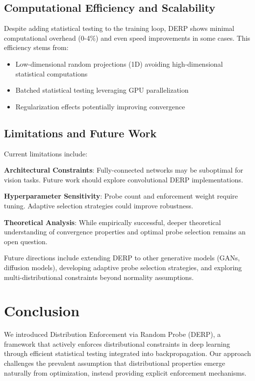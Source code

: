 \documentclass[11pt]{article}
\begin{document}
\subsection{Computational Efficiency and Scalability}

Despite adding statistical testing to the training loop, DERP shows minimal computational overhead (0-4\%) and even speed improvements in some cases. This efficiency stems from:

\begin{itemize}
\item Low-dimensional random projections (1D) avoiding high-dimensional statistical computations
\item Batched statistical testing leveraging GPU parallelization  
\item Regularization effects potentially improving convergence
\end{itemize}

\subsection{Limitations and Future Work}

Current limitations include:

\textbf{Architectural Constraints}: Fully-connected networks may be suboptimal for vision tasks. Future work should explore convolutional DERP implementations.

\textbf{Hyperparameter Sensitivity}: Probe count and enforcement weight require tuning. Adaptive selection strategies could improve robustness.

\textbf{Theoretical Analysis}: While empirically successful, deeper theoretical understanding of convergence properties and optimal probe selection remains an open question.

Future directions include extending DERP to other generative models (GANs, diffusion models), developing adaptive probe selection strategies, and exploring multi-distributional constraints beyond normality assumptions.

\section{Conclusion}

We introduced Distribution Enforcement via Random Probe (DERP), a framework that actively enforces distributional constraints in deep learning through efficient statistical testing integrated into backpropagation. Our approach challenges the prevalent assumption that distributional properties emerge naturally from optimization, instead providing explicit enforcement mechanisms.
\end{document}
